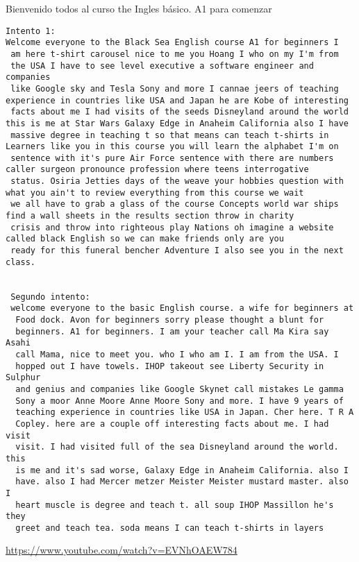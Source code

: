 Bienvenido todos al curso the Ingles b\'asico. A1 para comenzar 



\begin{verbatim}
Intento 1: 
Welcome everyone to the Black Sea English course A1 for beginners I
 am here t-shirt carousel nice to me you Hoang I who on my I'm from
 the USA I have to see level executive a software engineer and companies
 like Google sky and Tesla Sony and more I cannae jeers of teaching experience in countries like USA and Japan he are Kobe of interesting
 facts about me I had visits of the seeds Disneyland around the world this is me at Star Wars Galaxy Edge in Anaheim California also I have
 massive degree in teaching t so that means can teach t-shirts in Learners like you in this course you will learn the alphabet I'm on
 sentence with it's pure Air Force sentence with there are numbers caller surgeon pronounce profession where teens interrogative
 status. Osiria Jetties days of the weave your hobbies question with what you ain't to review everything from this course we wait
 we all have to grab a glass of the course Concepts world war ships find a wall sheets in the results section throw in charity
 crisis and throw into righteous play Nations oh imagine a website called black English so we can make friends only are you
 ready for this funeral bencher Adventure I also see you in the next class.
         
         
 Segundo intento: 
 welcome everyone to the basic English course. a wife for beginners at
  Food dock. Avon for beginners sorry please thought a blunt for 
  beginners. A1 for beginners. I am your teacher call Ma Kira say Asahi 
  call Mama, nice to meet you. who I who am I. I am from the USA. I 
  hopped out I have towels. IHOP takeout see Liberty Security in Sulphur 
  and genius and companies like Google Skynet call mistakes Le gamma 
  Sony a moor Anne Moore Anne Moore Sony and more. I have 9 years of 
  teaching experience in countries like USA in Japan. Cher here. T R A 
  Copley. here are a couple off interesting facts about me. I had visit 
  visit. I had visited full of the sea Disneyland around the world. this 
  is me and it's sad worse, Galaxy Edge in Anaheim California. also I 
  have. also I had Mercer metzer Meister Meister mustard master. also I 
  heart muscle is degree and teach t. all soup IHOP Massillon he's they 
  greet and teach tea. soda means I can teach t-shirts in layers
\end{verbatim} 

\url{https://www.youtube.com/watch?v=EVNhOAEW784}

